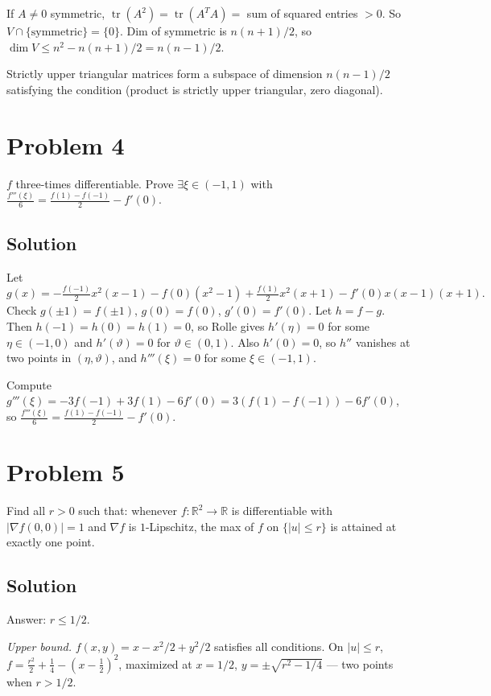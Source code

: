 \documentclass{article}
\begin{document}
If $A \ne 0$ symmetric, $\operatorname{tr}(A^2) = \operatorname{tr}(A^T A) = $ sum of squared entries $> 0$. So $V \cap \{\text{symmetric}\} = \{0\}$. Dim of symmetric is $n(n+1)/2$, so $\dim V \le n^2 - n(n+1)/2 = n(n-1)/2$.

Strictly upper triangular matrices form a subspace of dimension $n(n-1)/2$ satisfying the condition (product is strictly upper triangular, zero diagonal).

\section*{Problem 4}
$f$ three-times differentiable. Prove $\exists \xi \in (-1, 1)$ with $\tfrac{f'''(\xi)}{6} = \tfrac{f(1) - f(-1)}{2} - f'(0)$.

\subsection*{Solution}
Let
\[
g(x) = -\tfrac{f(-1)}{2} x^2(x-1) - f(0)(x^2 - 1) + \tfrac{f(1)}{2} x^2(x+1) - f'(0) x(x-1)(x+1).
\]
Check $g(\pm 1) = f(\pm 1)$, $g(0) = f(0)$, $g'(0) = f'(0)$. Let $h = f - g$. Then $h(-1) = h(0) = h(1) = 0$, so Rolle gives $h'(\eta) = 0$ for some $\eta \in (-1, 0)$ and $h'(\vartheta) = 0$ for $\vartheta \in (0, 1)$. Also $h'(0) = 0$, so $h''$ vanishes at two points in $(\eta, \vartheta)$, and $h'''(\xi) = 0$ for some $\xi \in (-1, 1)$.

Compute $g'''(\xi) = -3 f(-1) + 3 f(1) - 6 f'(0) = 3(f(1) - f(-1)) - 6 f'(0)$, so $\tfrac{f'''(\xi)}{6} = \tfrac{f(1) - f(-1)}{2} - f'(0)$.

\section*{Problem 5}
Find all $r > 0$ such that: whenever $f : \mathbb{R}^2 \to \mathbb{R}$ is differentiable with $|\nabla f(0,0)| = 1$ and $\nabla f$ is $1$-Lipschitz, the max of $f$ on $\{|u| \le r\}$ is attained at exactly one point.

\subsection*{Solution}
Answer: $r \le 1/2$.

\emph{Upper bound.} $f(x, y) = x - x^2/2 + y^2/2$ satisfies all conditions. On $|u| \le r$, $f = \tfrac{r^2}{2} + \tfrac{1}{4} - (x - \tfrac{1}{2})^2$, maximized at $x = 1/2$, $y = \pm\sqrt{r^2 - 1/4}$ — two points when $r > 1/2$.
\end{document}
